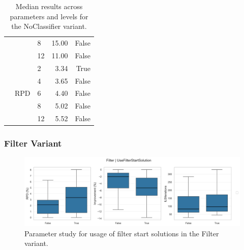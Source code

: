 \begin{table}[!ht]
\begin{tabular}{l l l r r}
		                                               &                                   & 8                     & 15.00           & False           \\\cmidrule(lr){3-5}
		                                               &                                   & 12                    & 11.00           & False           \\\cmidrule(lr){2-5}
		                                               & \multirow[t]{5}{*}{RPD}           & 2                     & 3.34            & True            \\\cmidrule(lr){3-5}
		                                               &                                   & 4                     & 3.65            & False           \\\cmidrule(lr){3-5}
		                                               &                                   & 6                     & 4.40            & False           \\\cmidrule(lr){3-5}
		                                               &                                   & 8                     & 5.02            & False           \\\cmidrule(lr){3-5}
		                                               &                                   & 12                    & 5.52            & False           \\\bottomrule
	\end{tabular}


	\caption{Median results across parameters and levels for the NoClassifier variant.}
	\label{tab:numerical_results_paramStudy_NOclassifiers}
\end{table}
\clearpage
\subsubsection{Filter Variant}
\label{app:subsec:parameterstudy_Filter}

\begin{figure}[!ht]
	\centering
	\includegraphics[width=\linewidth]{pictures/parameter_study/UseFilterStartSolution_Filter_parameter_study.png}
	\caption{Parameter study for usage of filter start solutions in the Filter variant.}
	\label{fig:parameter_study_filter}
\end{figure}



